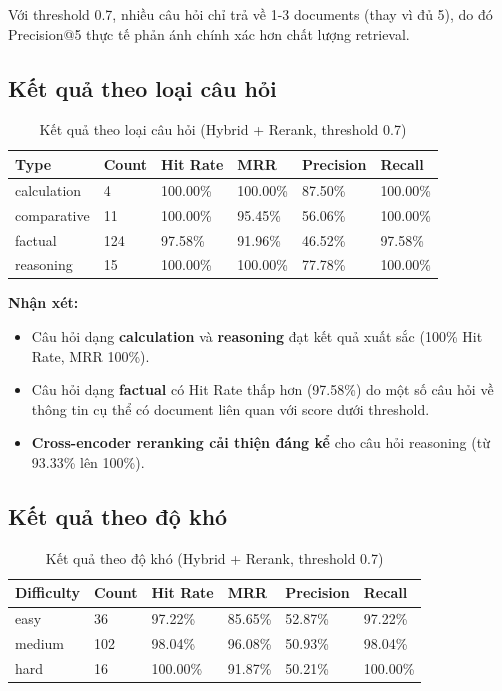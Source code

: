 \documentclass[../DoAn.tex]{subfiles}
\begin{document}
Với threshold 0.7, nhiều câu hỏi chỉ trả về 1-3 documents (thay vì đủ 5), do đó Precision@5 thực tế phản ánh chính xác hơn chất lượng retrieval.

\subsection{Kết quả theo loại câu hỏi}
\begin{table}[h]
\centering
\begin{tabular}{|l|l|l|l|l|l|}
\hline
\textbf{Type} & \textbf{Count} & \textbf{Hit Rate} & \textbf{MRR} & \textbf{Precision} & \textbf{Recall} \\
\hline
calculation & 4 & 100.00\% & 100.00\% & 87.50\% & 100.00\% \\
\hline
comparative & 11 & 100.00\% & 95.45\% & 56.06\% & 100.00\% \\
\hline
factual & 124 & 97.58\% & 91.96\% & 46.52\% & 97.58\% \\
\hline
reasoning & 15 & 100.00\% & 100.00\% & 77.78\% & 100.00\% \\
\hline
\end{tabular}
\caption{Kết quả theo loại câu hỏi (Hybrid + Rerank, threshold 0.7)}
\end{table}

\textbf{Nhận xét:}
\begin{itemize}
    \item Câu hỏi dạng \textbf{calculation} và \textbf{reasoning} đạt kết quả xuất sắc (100\% Hit Rate, MRR 100\%).
    \item Câu hỏi dạng \textbf{factual} có Hit Rate thấp hơn (97.58\%) do một số câu hỏi về thông tin cụ thể có document liên quan với score dưới threshold.
    \item \textbf{Cross-encoder reranking cải thiện đáng kể} cho câu hỏi reasoning (từ 93.33\% lên 100\%).
\end{itemize}

\subsection{Kết quả theo độ khó}
\begin{table}[h]
\centering
\begin{tabular}{|l|l|l|l|l|l|}
\hline
\textbf{Difficulty} & \textbf{Count} & \textbf{Hit Rate} & \textbf{MRR} & \textbf{Precision} & \textbf{Recall} \\
\hline
easy & 36 & 97.22\% & 85.65\% & 52.87\% & 97.22\% \\
\hline
medium & 102 & 98.04\% & 96.08\% & 50.93\% & 98.04\% \\
\hline
hard & 16 & 100.00\% & 91.87\% & 50.21\% & 100.00\% \\
\hline
\end{tabular}
\caption{Kết quả theo độ khó (Hybrid + Rerank, threshold 0.7)}
\end{table}
\end{document}
